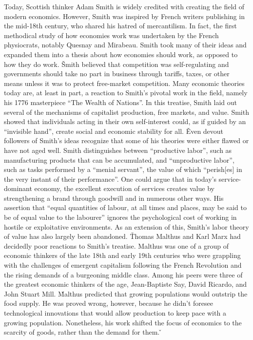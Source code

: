 Today, Scottish thinker Adam Smith is widely credited with creating the field of modern economics. However, Smith was
inspired by French writers publishing in the mid-18th century, who shared his hatred of mercantilism. In fact, the
first methodical study of how economies work was undertaken by the French physiocrats, notably Quesnay and Mirabeau.
Smith took many of their ideas and expanded them into a thesis about how economies should work, as opposed to how
they do work. \v

Smith believed that competition was self-regulating and governments should take no part in business through tariffs,
taxes, or other means unless it was to protect free-market competition. Many economic theories today are, at least in
part, a reaction to Smith's pivotal work in the field, namely his 1776 masterpiece ``The Wealth of Nations''. In this
treatise, Smith laid out several of the mechanisms of capitalist production, free markets, and value. Smith showed
that individuals acting in their own self-interest could, as if guided by an ``invisible hand'', create social and
economic stability for all. \v

Even devout followers of Smith's ideas recognize that some of his theories were either flawed or have not aged well.
Smith distinguishes between ``productive labor'', such as manufacturing products that can be accumulated, and
``unproductive labor'', such as tasks performed by a ``menial servant'', the value of which ``perish[es] in the very
instant of their performance''. One could argue that in today's service-dominant economy, the excellent execution of
services creates value by strengthening a brand through goodwill and in numerous other ways. His assertion that
``equal quantities of labour, at all times and places, may be said to be of equal value to the labourer'' ignores the
psychological cost of working in hostile or exploitative environments. As an extension of this, Smith's labor theory
of value has also largely been abandoned. \v

Thomas Malthus and Karl Marx had decidedly poor reactions to Smith's treatise. Malthus was one of a group of economic
thinkers of the late 18th and early 19th centuries who were grappling with the challenges of emergent capitalism
following the French Revolution and the rising demands of a burgeoning middle class. Among his peers were three of
the greatest economic thinkers of the age, Jean-Baptiste Say, David Ricardo, and John Stuart Mill. \v

Malthus predicted that growing populations would outstrip the food supply. He was proved wrong, however, because he
didn't foresee technological innovations that would allow production to keep pace with a growing population.
Nonetheless, his work shifted the focus of economics to the scarcity of goods, rather than the demand for them. \v

